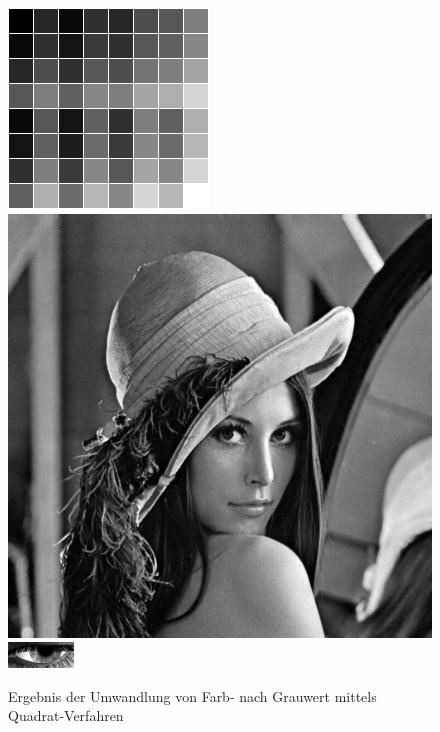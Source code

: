 \begin{figure}
	\centering
	\includegraphics[width=0.2\linewidth]{img/Farbkarte3}
	\includegraphics[width=0.2\linewidth]{img/Lena3}
	\includegraphics[width=0.2\linewidth]{img/Auge_3Gray}
	\caption{Ergebnis der Umwandlung von Farb- nach Grauwert mittels Quadrat-Verfahren}
	\label{img_Quadrat}
\end{figure}